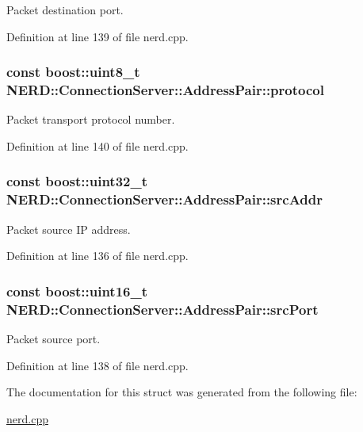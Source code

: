 \-Packet destination port. 



\-Definition at line 139 of file nerd.\-cpp.

\hypertarget{structNERD_1_1ConnectionServer_1_1AddressPair_a298c525bf23bb1ccec0d7d1b2b4ee2db}{
\subsubsection[{protocol}]{\setlength{\rightskip}{0pt plus 5cm}const boost\-::uint8\-\_\-t {\bf \-N\-E\-R\-D\-::\-Connection\-Server\-::\-Address\-Pair\-::protocol}}}
\label{structNERD_1_1ConnectionServer_1_1AddressPair_a298c525bf23bb1ccec0d7d1b2b4ee2db}


\-Packet transport protocol number. 



\-Definition at line 140 of file nerd.\-cpp.

\hypertarget{structNERD_1_1ConnectionServer_1_1AddressPair_a96cf9e68f77b3c0894cc70be7440c230}{
\subsubsection[{src\-Addr}]{\setlength{\rightskip}{0pt plus 5cm}const boost\-::uint32\-\_\-t {\bf \-N\-E\-R\-D\-::\-Connection\-Server\-::\-Address\-Pair\-::src\-Addr}}}
\label{structNERD_1_1ConnectionServer_1_1AddressPair_a96cf9e68f77b3c0894cc70be7440c230}


\-Packet source \-I\-P address. 



\-Definition at line 136 of file nerd.\-cpp.

\hypertarget{structNERD_1_1ConnectionServer_1_1AddressPair_ae4d253c1b72fe3424484d5d02a38c073}{
\subsubsection[{src\-Port}]{\setlength{\rightskip}{0pt plus 5cm}const boost\-::uint16\-\_\-t {\bf \-N\-E\-R\-D\-::\-Connection\-Server\-::\-Address\-Pair\-::src\-Port}}}
\label{structNERD_1_1ConnectionServer_1_1AddressPair_ae4d253c1b72fe3424484d5d02a38c073}


\-Packet source port. 



\-Definition at line 138 of file nerd.\-cpp.



\-The documentation for this struct was generated from the following file\-:\begin{DoxyCompactItemize}
\item 
\hyperlink{nerd_8cpp}{nerd.\-cpp}\end{DoxyCompactItemize}

